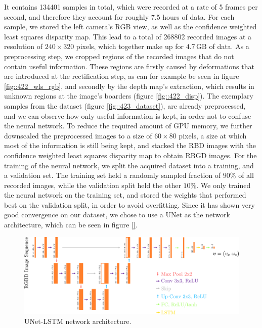 It contains 134401 samples in total, which were recorded at a rate of 5 frames per second, and therefore they account for roughly 7.5 hours of data. For each sample, we stored the left camera's RGB view, as well as the confidence weighted least squares disparity map. This lead to a total of 268802 recorded images at a resolution of $240\times320$ pixels, which together make up for $4.7\,\text{GB}$ of data. As a preprocessing step, we cropped regions of the recorded images that do not contain useful information. These regions are firstly caused by deformations that are introduced at the rectification step, as can for example be seen in figure \ref{fig::422_wls_rgb}, and secondly by the depth map's extraction, which results in unknown regions at the image's boarders (figure \ref{fig::422_disp}). The exemplary samples from the dataset (figure \ref{fig::423_dataset}), are already preprocessed, and we can observe how only useful information is kept, in order not to confuse the neural network. To reduce the required amount of GPU memory, we further downscaled the preprocessed images to a size of $60\times80$ pixels, a size at which most of the information is still being kept, and stacked the RBD images with the confidence weighted least squares disparity map to obtain RBGD images. For the training of the neural network, we split the acquired dataset into a training, and a validation set. The training set held a randomly sampled fraction of $90\%$ of all recorded images, while the validation split held the other $10\%$. We only trained the neural network on the training set, and stored the weights that performed best on the validation split, in order to avoid overfitting. Since it has shown very good convergence on our dataset, we chose to use a UNet \cite{ronneberger2015u} as the network architecture, which can be seen in figure \ref{}.
\begin{figure}[h!]
	\centering
	\includegraphics[scale=.5]{chapters/04_experiments/02_autonomous_walking/unet.png}
	\caption{UNet-LSTM network architecture.}
	\label{fig::423_unet}
\end{figure}
